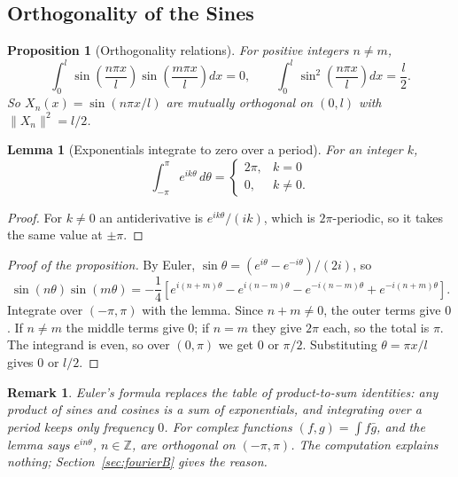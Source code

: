 \documentclass{article}
\newtheorem{lemma}[theorem]{Lemma}
\newtheorem{remark}{Remark}
\newtheorem{proposition}{Proposition}
\begin{document}
\subsection{Orthogonality of the Sines}
\begin{proposition}[Orthogonality relations]
    For positive integers $n \neq m$,
    \begin{equation}
        \int_0^l \sin\left(\frac{n\pi x}{l}\right)\sin\left(\frac{m\pi x}{l}\right)dx = 0, \qquad \int_0^l \sin^2\left(\frac{n\pi x}{l}\right)dx = \frac{l}{2}.
    \end{equation}
    So $X_n(x) = \sin(n\pi x/l)$ are mutually orthogonal on $(0,l)$ with $\|X_n\|^2 = l/2$.
\end{proposition}
\begin{lemma}[Exponentials integrate to zero over a period]
    For an integer $k$,
    \begin{equation}
        \int_{-\pi}^{\pi} e^{ik\theta}\,d\theta = \begin{cases} 2\pi, & k = 0 \\ 0, & k \neq 0. \end{cases}
    \end{equation}
\end{lemma}
\begin{proof}
    For $k \neq 0$ an antiderivative is $e^{ik\theta}/(ik)$, which is $2\pi$-periodic, so it takes the same value at $\pm\pi$.
\end{proof}
\begin{proof}[Proof of the proposition]
    By Euler, $\sin\theta = (e^{i\theta} - e^{-i\theta})/(2i)$, so
    \begin{equation}
        \sin(n\theta)\sin(m\theta) = -\frac14\left[e^{i(n+m)\theta} - e^{i(n-m)\theta} - e^{-i(n-m)\theta} + e^{-i(n+m)\theta}\right].
    \end{equation}
    Integrate over $(-\pi,\pi)$ with the lemma. Since $n + m \neq 0$, the outer terms give $0$. If $n \neq m$ the middle terms give $0$; if $n = m$ they give $2\pi$ each, so the total is $\pi$. The integrand is even, so over $(0,\pi)$ we get $0$ or $\pi/2$. Substituting $\theta = \pi x/l$ gives $0$ or $l/2$.
\end{proof}
\begin{remark}
    Euler's formula replaces the table of product-to-sum identities: any product of sines and cosines is a sum of exponentials, and integrating over a period keeps only frequency $0$. For complex functions $(f,g) = \int f\bar{g}$, and the lemma says $e^{in\theta}$, $n \in \mathbb{Z}$, are orthogonal on $(-\pi,\pi)$. The computation explains nothing; Section~\ref{sec:fourierB} gives the reason.
\end{remark}
\end{document}
